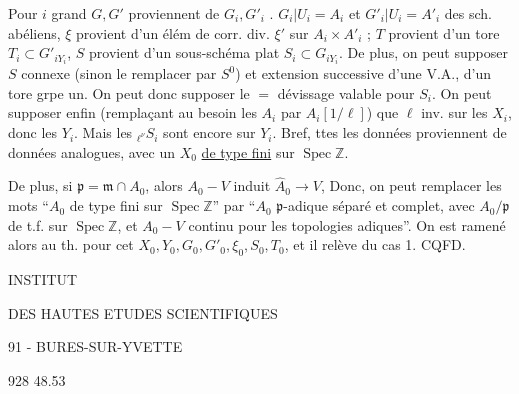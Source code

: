 Pour $i$ grand $G,G'$ proviennent de $G_i,G'_i$ .
$G_i|U_i=A_i$ et $G'_i|U_i=A'_i$ des sch. abéliens, $\xi$ provient d'un élém de corr. div. $\xi'$ sur $A_i\times A'_i$ ; $T$ provient d'un tore $T_i\subset G'_{iY_i}$, $S$ provient d'un sous-schéma plat $S_i\subset G_{iY_i}$.
De plus,   on peut  supposer $S$ connexe  (sinon le remplacer par $S^0$) et  extension  successive d'une V.A., d'un tore  grpe un. On peut donc supposer le $=$ dévissage valable pour $S_i$.
On peut supposer enfin (remplaçant au besoin les $A_i$ par $A_i[1/\ell]$) que $\ell$ inv. sur les $X_i$, donc les $Y_i$. Mais les ${}_{\ell^\nu}S_i$ sont encore  sur $Y_i$. Bref, ttes les données proviennent de données analogues, avec un  $X_0$  \uline{de type fini} sur $\operatorname{Spec}\mathbb Z$.

De plus, si $\mathfrak p=\mathfrak m\cap A_0$, alors $A_0\mathbin{-}V$ induit $\widehat A_0\longrightarrow V$,  Donc, on peut remplacer les mots ``$A_0$ de type fini sur $\operatorname{Spec}\mathbb Z$'' par ``$A_0$ $\mathfrak p$-adique séparé et complet, avec $A_0/\mathfrak p$ de t.f. sur $\operatorname{Spec}\mathbb Z$, et $A_0\mathbin{-}V$ continu pour les topologies adiques''. On est ramené alors au th. pour cet $X_0,Y_0,G_0,G'_0,\xi_0,S_0,T_0$, et il relève du cas 1.
\hfill CQFD.

INSTITUT

DES HAUTES ETUDES SCIENTIFIQUES

91 - BURES-SUR-YVETTE

928 48.53

